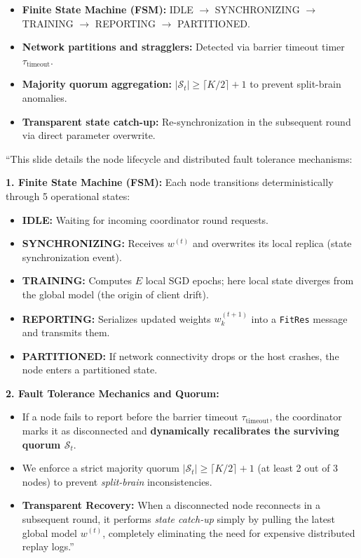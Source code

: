\documentclass[11pt,a4paper]{article}
\begin{document}
\begin{tcolorbox}[colframe=primaryblue, title=\textbf{Key Distributed Systems Points to Emphasize}]
\begin{itemize}[leftmargin=*]
    \item \textbf{Finite State Machine (FSM):} IDLE $\to$ SYNCHRONIZING $\to$ TRAINING $\to$ REPORTING $\to$ PARTITIONED.
    \item \textbf{Network partitions and stragglers:} Detected via barrier timeout timer $\tau_{\text{timeout}}$.
    \item \textbf{Majority quorum aggregation:} $|\mathcal{S}_t| \geq \lceil K/2 \rceil + 1$ to prevent split-brain anomalies.
    \item \textbf{Transparent state catch-up:} Re-synchronization in the subsequent round via direct parameter overwrite.
\end{itemize}
\end{tcolorbox}

\begin{tcolorbox}[colframe=darkgreen, title=\textbf{What to Say in the Presentation (Literal Script)}]
``This slide details the node lifecycle and distributed fault tolerance mechanisms:

\textbf{1. Finite State Machine (FSM):}
Each node transitions deterministically through 5 operational states:
\begin{itemize}
    \item \textbf{IDLE:} Waiting for incoming coordinator round requests.
    \item \textbf{SYNCHRONIZING:} Receives $w^{(t)}$ and overwrites its local replica (state synchronization event).
    \item \textbf{TRAINING:} Computes $E$ local SGD epochs; here local state diverges from the global model (the origin of client drift).
    \item \textbf{REPORTING:} Serializes updated weights $w_k^{(t+1)}$ into a \texttt{FitRes} message and transmits them.
    \item \textbf{PARTITIONED:} If network connectivity drops or the host crashes, the node enters a partitioned state.
\end{itemize}

\textbf{2. Fault Tolerance Mechanics and Quorum:}
\begin{itemize}
    \item If a node fails to report before the barrier timeout $\tau_{\text{timeout}}$, the coordinator marks it as disconnected and \textbf{dynamically recalibrates the surviving quorum $\mathcal{S}_t$}.
    \item We enforce a strict majority quorum $|\mathcal{S}_t| \geq \lceil K/2 \rceil + 1$ (at least 2 out of 3 nodes) to prevent \textit{split-brain} inconsistencies.
    \item \textbf{Transparent Recovery:} When a disconnected node reconnects in a subsequent round, it performs \textit{state catch-up} simply by pulling the latest global model $w^{(t)}$, completely eliminating the need for expensive distributed replay logs.''
\end{itemize}
\end{tcolorbox}
\end{document}
